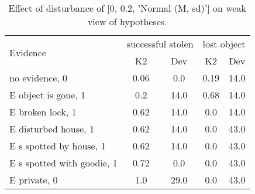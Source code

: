 \begin{table}\begin{tabular}{l|cc|cc}\toprule\multirow{2}{*}{Evidence} & \multicolumn{2}{c}{successful stolen}& \multicolumn{2}{c}{lost object}\\& {K2} & {Dev}& {K2} & {Dev}\\\midrule
no evidence, 0 & \cellcolor{Bittersweet}0.06&\cellcolor{Bittersweet}0.0&\cellcolor{Bittersweet}0.19&\cellcolor{Bittersweet}14.0\\E object is gone, 1 & \cellcolor{Bittersweet}0.2&\cellcolor{Bittersweet}14.0&\cellcolor{Bittersweet}0.68&\cellcolor{Bittersweet}14.0\\E broken lock, 1 & \cellcolor{Bittersweet}0.62&\cellcolor{Bittersweet}14.0&\cellcolor{Bittersweet}0.0&\cellcolor{Bittersweet}14.0\\E disturbed house, 1 & \cellcolor{Bittersweet}0.62&\cellcolor{Bittersweet}14.0&\cellcolor{Bittersweet}0.0&\cellcolor{Bittersweet}43.0\\E s spotted by house, 1 & \cellcolor{Bittersweet}0.62&\cellcolor{Bittersweet}14.0&\cellcolor{Bittersweet}0.0&\cellcolor{Bittersweet}43.0\\E s spotted with goodie, 1 & \cellcolor{Bittersweet}0.72&\cellcolor{Bittersweet}0.0&\cellcolor{Bittersweet}0.0&\cellcolor{Bittersweet}43.0\\E private, 0 & \cellcolor{Bittersweet}1.0&\cellcolor{Bittersweet}29.0&\cellcolor{Bittersweet}0.0&\cellcolor{Bittersweet}43.0\\\bottomrule\end{tabular}\caption{Effect of disturbance of [0, 0.2, 'Normal (M, sd)'] on weak view of hypotheses.}\end{table}